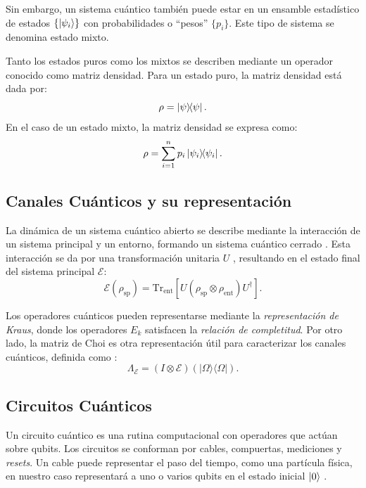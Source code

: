 \documentclass[11pt, spanish, letterpage]{article} %
\begin{document}
Sin embargo, un sistema cuántico también puede estar en un ensamble estadístico
de estados $\{\ket{\psi_i}\}$ con probabilidades o ``pesos'' $\{p_i\}$. Este tipo
de sistema se denomina estado mixto. 

Tanto los estados puros como los mixtos se describen mediante un operador
conocido como matriz densidad. Para un estado puro, la matriz densidad está
dada por:
\begin{equation}
    \label{ec:1.5}
    \rho = \ketbra{\psi}.
\end{equation}
En el caso de un estado mixto, la matriz densidad se expresa como:
\begin{equation}
\label{dens_mixtos}
    \rho = \sum_{i=1}^{n} p_i \ketbra{\psi_i}.
\end{equation}




\subsection{Canales Cuánticos y su representación}
La dinámica de un sistema cuántico abierto se describe mediante la interacción
de un sistema principal y un entorno, formando un sistema cuántico cerrado
\cite{nielsen_chuang_2011}. Esta
interacción se da por una transformación
unitaria $U$ , resultando en el estado final del sistema principal
$\mathcal{E}$:
\begin{equation}
    \mathcal{E}(\rho_{\text{sp}}) = \text{Tr}_{\text{ent}}[ U( \rho_{\text{sp}} \otimes \rho_{\text{ent}} ) U^\dagger ].
\end{equation}

Los operadores cuánticos pueden representarse mediante la \textit{representación de Kraus}, donde los operadores ${E_k}$ satisfacen la \textit{relación de completitud}.  Por otro lado, la matriz de Choi es otra representación útil para caracterizar los canales cuánticos, definida como \cite{Choi2024}:
\begin{equation}
\Lambda_{\mathcal{E}} = (I \otimes \mathcal{E})(|\Omega\rangle\langle\Omega|).
\end{equation}

\subsection{Circuitos Cuánticos}
Un circuito cuántico es una rutina computacional con operadores que actúan sobre qubits. Los circuitos se conforman por cables, compuertas, mediciones y \textit{resets}. Un cable puede representar el paso del tiempo, como una partícula física, en nuestro caso representará a uno o varios qubits en el estado inicial $\ket{0}$ \cite{nielsen_chuang_2011}. 
\end{document}
